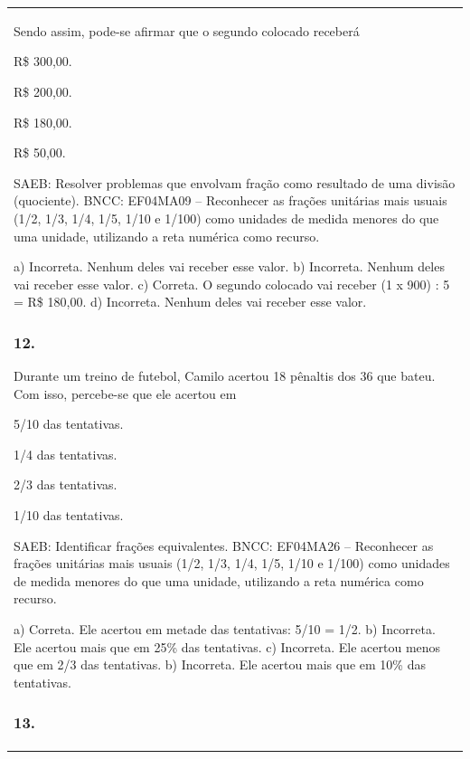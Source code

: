 \begin{mdframed}[linewidth=2pt,linecolor=salmao,roundcorner=2pt]
\begin{escolha}
{{{\begin{longtable}[]{@{}l@{}}
\begin{itemize}
{Sendo assim, pode-se afirmar que o segundo colocado receberá

\begin{escolha}
\item
  R\$ 300,00.
\item
  R\$ 200,00.
\item
  R\$ 180,00.
\item
  R\$ 50,00.
\end{escolha}

SAEB: Resolver problemas que envolvam fração como resultado
de uma divisão (quociente).
BNCC: EF04MA09 -- Reconhecer as frações unitárias mais usuais (1/2, 1/3, 1/4, 1/5, 1/10 e 1/100) como
unidades de medida menores do que uma unidade, utilizando a reta numérica como recurso.

a) Incorreta. Nenhum deles vai receber esse valor.
b) Incorreta. Nenhum deles vai receber esse valor.
c) Correta. O segundo colocado vai receber (1 x 900) : 5 = R\$ 180,00.
d) Incorreta. Nenhum deles vai receber esse valor.

\subsubsection{12.}

Durante um treino de futebol, Camilo acertou 18 pênaltis dos 36 que
bateu. Com isso, percebe-se que ele acertou em

\begin{escolha}
\item
  5/10 das tentativas.
\item
  1/4 das tentativas.
\item
  2/3 das tentativas.
\item
  1/10 das tentativas.
\end{escolha}

SAEB: Identificar frações equivalentes.
BNCC: EF04MA26 -- Reconhecer as frações unitárias mais usuais (1/2, 1/3, 1/4, 1/5, 1/10 e 1/100) como
unidades de medida menores do que uma unidade, utilizando a reta numérica como recurso.

a) Correta. Ele acertou em metade das tentativas: 5/10 = 1/2.
b) Incorreta. Ele acertou mais que em 25\% das tentativas.
c) Incorreta. Ele acertou menos que em 2/3 das tentativas.
b) Incorreta. Ele acertou mais que em 10\% das tentativas.

\subsubsection{13.}

}
\end{itemize}
\end{longtable}}}}
\end{escolha}
\end{mdframed}
